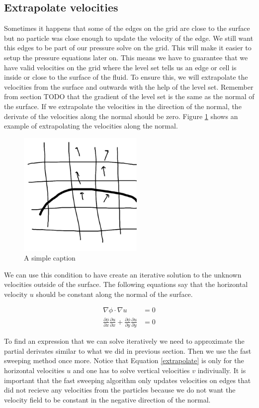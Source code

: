 \subsection{Extrapolate velocities}

Sometimes it happens that some of the edges on the grid are close to the surface but no particle was close enough to update the velocity of the edge. We still want this edges to be part of our pressure solve on the grid. This will make it easier to setup the pressure equations later on. This means we have to guarantee that we have valid velocities on the grid where the level set tells us an edge or cell is inside or close to the surface of the fluid. To ensure this, we will extrapolate the velocities from the surface and outwards with the help of the level set. Remember from section TODO that the gradient of the level set is the same as the normal of the surface. If we extrapolate the velocities in the direction of the normal, the derivate of the velocities along the normal should be zero. Figure \ref{extrapic} shows an example of extrapolating the velocities along the normal.

\begin{figure}[ht!]
\centering
\includegraphics[width=60mm]{ch4/extra.png}
\caption{A simple caption}
\label{extrapic}
\end{figure}

We can use this condition to have create an iterative solution to the unknown velocities outside of the surface. The following equations say that the horizontal velocity $u$ should be constant along the normal of the surface.

\begin{equation}
\begin{split}
\nabla \phi \cdot \nabla u &= 0 \\
\frac{\partial \phi}{\partial x}\frac{\partial u}{\partial x} + 
\frac{\partial \phi}{\partial y}\frac{\partial u}{\partial y}&= 0
\end{split}
\label{extrapolate}
\end{equation}

To find an expression that we can solve iteratively we need to approximate the partial derivates similar to what we did in previous section. Then we use the fast sweeping method once more. Notice that Equation \ref{extrapolate} is only for the horizontal velocities $u$ and one has to solve vertical velocities $v$ indiviually. It is important that the fast sweeping algorithm only updates velocities on edges that did not recieve any velocities from the particles because we do not want the velocity field to be constant in the negative direction of the normal.
